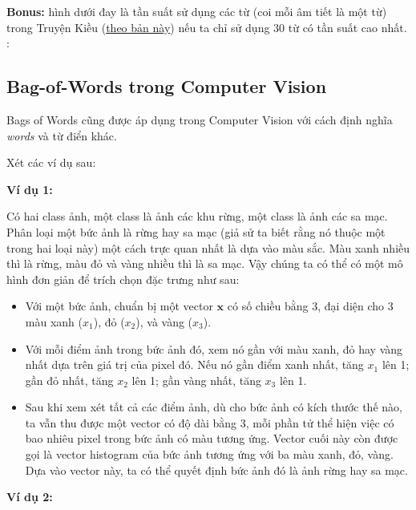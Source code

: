 \textbf{Bonus:} hình dưới đay là tần suất sử dụng các từ (coi mỗi âm tiết là một từ) trong Truyện Kiều (\href{https://bitbucket.org/tiepvupsu/vietnamese/src/c6f3af6050f8ca911ed0fa209220ce3c99010075/TruyenKieu2.txt?at=master&fileviewer=file-view-default}{theo bản này}) nếu ta chỉ sử dụng 30 từ có tần suất cao nhất. : 
 
 
\subsection{Bag-of-Words trong Computer Vision }
Bags of Words cũng được áp dụng trong Computer Vision với cách định nghĩa \textit{words} và từ điển khác.  
 
Xét các ví dụ sau:  
 
\textbf{Ví dụ 1:} 
 
Có hai class ảnh, một class là ảnh các khu rừng, một class là ảnh các sa mạc. Phân loại một bức ảnh là rừng hay sa mạc (giả sử ta biết rằng nó thuộc một trong hai loại này) một cách trực quan nhất là dựa vào màu sắc. Màu xanh nhiều thì là rừng, màu đỏ và vàng nhiều thì là sa mạc. Vậy chúng ta có thể có một mô hình đơn giản để trích chọn đặc trưng như sau: 

\begin{itemize}
    \item Với một bức ảnh, chuẩn bị một vector $\mathbf{x}$ có số chiều bằng 3, đại diện cho 3 màu xanh ($x_1$), đỏ ($x_2$), và vàng ($x_3$).  

    \item Với mỗi điểm ảnh trong bức ảnh đó, xem nó gần với màu xanh, đỏ hay vàng nhất dựa trên giá trị của pixel đó. Nếu nó gần điểm xanh nhất, tăng $x_1$ lên 1; gần đỏ nhất, tăng $x_2$ lên 1; gần vàng nhất, tăng $x_3$ lên 1.  

    \item Sau khi xem xét tất cả các điểm ảnh, dù cho bức ảnh có kích thước thế nào, ta vẫn thu được một vector có độ dài bằng 3, mỗi phần tử thể hiện việc có bao nhiêu pixel trong bức ảnh có màu tương ứng. Vector cuối này còn được gọi là vector histogram của bức ảnh tương ứng với ba màu xanh, đỏ, vàng. Dựa vào vector này, ta có thể quyết định bức ảnh đó là ảnh rừng hay sa mạc.  
\end{itemize}
 
\textbf{Ví dụ 2:} 
 
